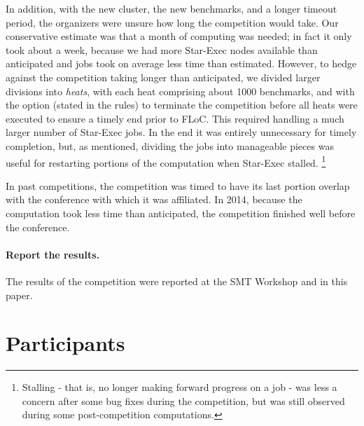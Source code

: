 \documentclass[twosize,11pt]{article}
\begin{document}
In addition, with the new cluster, the new benchmarks, and a longer timeout period, the organizers were unsure how long the competition would take. Our conservative estimate was that a month of computing was needed; in fact it only took about a week, because we had more Star-Exec nodes available than anticipated and jobs took on average less time than estimated. However, to hedge against the competition taking longer than anticipated, we divided larger divisions into \textit{heats}, with each heat comprising about 1000 benchmarks, and with the option (stated in the rules) to terminate the competition before all heats were executed to ensure a timely end prior to FLoC. This required handling a much larger number of Star-Exec jobs. In the end it was entirely unnecessary for timely completion, but, as mentioned, dividing the jobs into manageable pieces was useful for restarting portions of the computation when Star-Exec stalled.
\footnote{Stalling - that is, no longer making forward progress on a job - was less a concern after some bug fixes during the competition, but was still observed during some post-competition computations.}

In past competitions, the competition was timed to have its last portion overlap with the conference with which it was affiliated. In 2014, because the computation took less time than anticipated, the competition finished well before the conference.

\paragraph{Report the results.} The results of the competition were reported at the SMT Workshop and in this paper.

\section{Participants}
\label{sec:participants}
\end{document}
